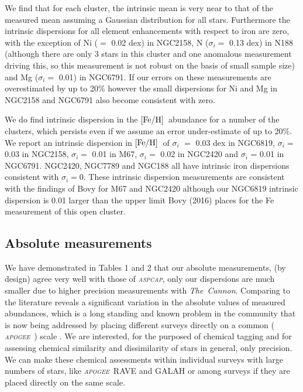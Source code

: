 \documentclass[14pt, preprint2]{aastex6}
\newcommand{\project}[1]{\textsl{#1}}
\newcommand{\tc}{\project{The~Cannon}}
\newcommand{\apogee}{\project{\textsc{apogee}}}
\newcommand{\aspcap}{\project{\textsc{aspcap}}}
\newcommand{\feh}{\mbox{$\rm [Fe/H]$}}
\begin{document}
We find that for each cluster, the intrinsic mean is very near to that of the measured mean assuming a Gaussian distribution for all stars. Furthermore the intrinsic dispersions for all element enhancements with respect to iron are zero, with the exception of Ni ($=$ 0.02 dex) in NGC2158, N ($\sigma_i$$=$ 0.13 dex) in N188 (although there are only 3 stars in this cluster and one anomalous measurement driving this, so this measurement is not robust on the basis of small sample size) and Mg ($\sigma_i$$=$ 0.01) in NGC6791. If our errors on these measurements are overestimated by up to 20\% however the small dispersions for Ni and Mg in NGC2158 and NGC6791 also become consistent with zero. 

We do find intrinsic dispersion in the \feh\ abundance for a number of the clusters, which persists even if we assume an error under-estimate of up to 20\%. We report an intrinsic dispersion in \feh\ of $\sigma_i$ $=$ 0.03 dex in NGC6819, $\sigma_i$$=$0.03 in NGC2158, $\sigma_i$$=$ 0.01 in M67,  $\sigma_i$$=$ 0.02 in NGC2420 and $\sigma_i$ = 0.01 in NGC6791. NGC2420, NGC7789 and NGC188 all have intrinsic iron dispersions consistent with  $\sigma_i$$=$0. These intrinsic dispersion measurements are consistent with the findings of Bovy for M67 and NGC2420 although our NGC6819 intrinsic dispersion is 0.01 larger than the upper limit Bovy (2016) places for the Fe measurement of this open cluster. 


\subsection{Absolute measurements}

We have demonstrated in Tables 1 and 2 that our absolute measurements, (by design) agree very well with those of \aspcap, only our dispersions are much smaller due to higher precision measurements with \tc. Comparing to the literature reveals a significant variation in the absolute values of measured abundances, which is a long standing and known problem in the community  \citep[e.g.][]{smil2014} that is now being addressed by placing different surveys directly on a common ( \apogee\ ) scale \citep[e.g.][]{Ho2016,Casey2016}. We are interested, for the purposed of chemical tagging and for assessing chemical similarity and dissimilarity of stars in general, only precision. We can make these chemical assessments within individual surveys with large numbers of stars, like \apogee\, RAVE and GALAH or among surveys if they are placed directly on the same scale. 
\end{document}
